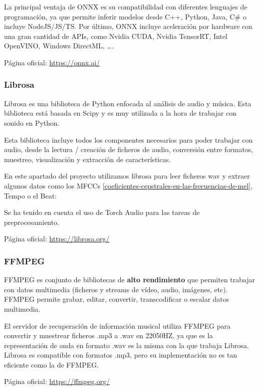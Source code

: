 La principal ventaja de ONNX es su compatibilidad con diferentes lenguajes de programación, ya que permite inferir modelos desde C++, Python, Java, C\# o incluye NodeJS/JS/TS.
Por último, ONNX incluye aceleración por hardware con una gran cantidad de APIs, como Nvidia CUDA, Nvidia TensorRT, Intel OpenVINO, Windows DirectML, \ldots.

Página oficial: \href{https://onnx.ai/}{https://onnx.ai/}

\hypertarget{librosa}{%
\subsubsection{Librosa}\label{librosa}}

Librosa es una biblioteca de Python enfocada al análisis de audio y
música. Esta biblioteca está basada en Scipy y es muy utilizada a la
hora de trabajar con sonido en Python.

Esta biblioteca incluye todos los componentes necesarios para poder
trabajar con audio, desde la lectura / creación de ficheros de audio,
conversión entre formatos, muestreo, visualización y extracción de
características.

En este apartado del proyecto utilizamos librosa para leer ficheros wav
y extraer algunos datos como los MFCCs \ref{coeficientes-cepstrales-en-las-frecuencias-de-mel}, Tempo o el Beat:

Se ha tenido en cuenta el uso de Torch Audio para las tareas de
preprocesamiento.

Página oficial: \href{https://librosa.org/}{https://librosa.org/}

\hypertarget{ffmpeg}{%
\subsubsection{FFMPEG}\label{ffmpeg}}

FFMPEG es conjunto de bibliotecas de \textbf{alto rendimiento} que
permiten trabajar con datos multimedia (ficheros y streams de vídeo,
audio, imágenes, etc). FFMPEG permite grabar, editar, convertir,
transcodificar o escalar datos multimedia.

El servidor de recuperación de información musical utiliza FFMPEG para convertir y muestrear ficheros .mp3 a
.wav en 22050HZ, ya que es la representación de onda en formato .wav es la misma con la que trabaja Librosa. 
Librosa es compatible con formatos .mp3, pero su implementación no es tan eficiente como la de FFMPEG.

Página oficial: \href{https://ffmpeg.org/}{https://ffmpeg.org/}

